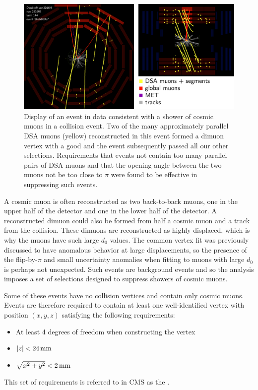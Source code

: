 \begin{figure}[htpb]
  \centering
  \includegraphics[width=\textwidth]{figures/displaced/ED_Cosmic.pdf}
  \caption{Display of an event in data consistent with a shower of cosmic muons in a \pp collision event. Two of the many approximately parallel DSA muons (yellow) reconstructed in this event formed a dimuon vertex with a good \vchisq and the event subsequently passed all our other selections. Requirements that events not contain too many parallel pairs of DSA muons and that the opening angle between the two muons not be too close to $\pi$ were found to be effective in suppressing such events.}
  \label{fig:dd:shower}
\end{figure}

A cosmic muon is often reconstructed as two back-to-back muons, one in the upper half of the detector and one in the lower half of the detector.
A reconstructed dimuon could also be formed from half a cosmic muon and a track from the \pp collision.
These dimuons are reconstructed as highly displaced, which is why the muons have such large $d_0$ values.
The common vertex fit was previously discussed to have anomalous behavior at large displacements, so the presence of the flip-by-$\pi$ and small \pT uncertainty anomalies when fitting to muons with large $d_0$ is perhaps not unexpected.
Such events are background events and so the analysis imposes a set of selections designed to suppress showers of cosmic muons.

Some of these events have no \pp collision vertices and contain only cosmic muons.
Events are therefore required to contain at least one well-identified vertex with position $(x, y, z)$ satisfying the following requirements:
\begin{itemize}
  \item At least 4 degrees of freedom when constructing the vertex
  \item $|z| < 24\,\text{mm}$
  \item $\sqrt{x^2 + y^2} < 2\,\text{mm}$
\end{itemize}
This set of requirements is referred to in CMS as the .

